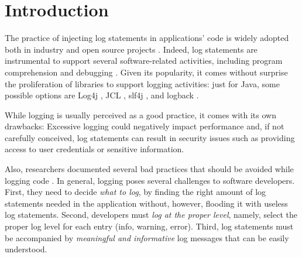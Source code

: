 \section{Introduction} \label{sec:intro}



The practice of injecting log statements in applications' code is widely adopted both in industry and open source projects \cite{oliner2012advances}. Indeed, log statements are instrumental to support several software-related activities, including program comprehension and debugging \cite{lu2017log,gurumdimma2016crude}. Given its popularity, it comes without surprise the proliferation of libraries to support logging activities: just for Java, some possible options are Log4j \cite{log4j}, JCL \cite{jcl}, slf4j \cite{slf4j}, and logback \cite{logback}.

While logging is usually perceived as a good practice, it comes with its own drawbacks: Excessive logging could negatively impact performance and, if not carefully conceived, log statements can result in security issues such as providing access to user credentials or sensitive information. 

Also, researchers documented several bad practices that should be avoided while logging code \cite{Chen:icse2017,Li:icse2019}. 
In general, logging poses several challenges to software developers. First, they need to decide \emph{what to log}, by finding the right amount of log statements needed in the application without, however, flooding it with useless log statements. Second, developers must \emph{log at the proper level}, namely, select the proper log level for each entry (\eg info, warning, error). Third, log statements must be accompanied by \emph{meaningful and informative} log messages that can be easily understood.

